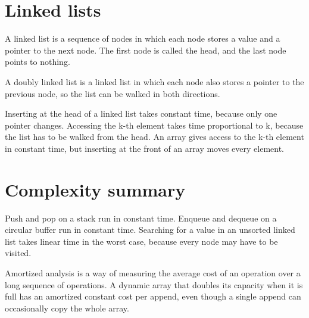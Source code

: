 \documentclass[11pt,a4paper]{article}
\begin{document}
\section{Linked lists}

A linked list is a sequence of nodes in which each node stores a value and a pointer to the next node. The first node is called the head, and the last node points to nothing.

A doubly linked list is a linked list in which each node also stores a pointer to the previous node, so the list can be walked in both directions.

Inserting at the head of a linked list takes constant time, because only one pointer changes. Accessing the k-th element takes time proportional to k, because the list has to be walked from the head. An array gives access to the k-th element in constant time, but inserting at the front of an array moves every element.

\section{Complexity summary}

Push and pop on a stack run in constant time. Enqueue and dequeue on a circular buffer run in constant time. Searching for a value in an unsorted linked list takes linear time in the worst case, because every node may have to be visited.

Amortized analysis is a way of measuring the average cost of an operation over a long sequence of operations. A dynamic array that doubles its capacity when it is full has an amortized constant cost per append, even though a single append can occasionally copy the whole array.
\end{document}
